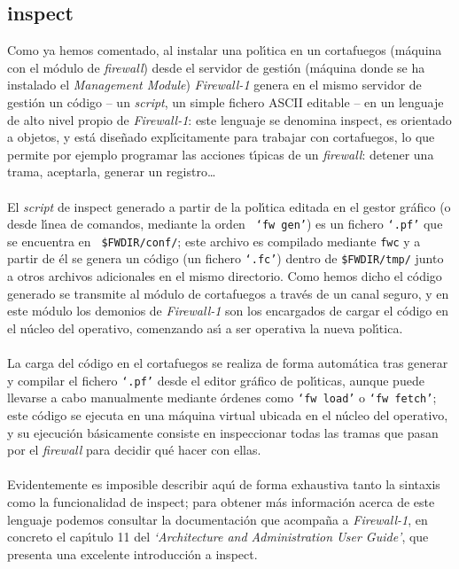 \subsection{\sc inspect}
\label{inspect}
Como ya hemos comentado, al instalar una pol\'{\i}tica en un cortafuegos 
(m\'aquina con el m\'odulo de {\it firewall}) desde el servidor de gesti\'on
(m\'aquina donde se ha instalado el {\it Management Module}) {\it Firewall-1} 
genera en el mismo servidor de gesti\'on un c\'odigo -- un {\it script}, un
simple fichero ASCII editable -- en un lenguaje de alto nivel propio de {\it 
Firewall-1}: este lenguaje se denomina {\sc inspect}, es orientado a objetos, y 
est\'a dise\~nado expl\'{\i}citamente 
para trabajar con cortafuegos, lo que permite por ejemplo programar las 
acciones t\'{\i}picas de un {\it firewall}: detener una trama, aceptarla, 
generar un registro\ldots\\ 
\\El {\it script} de {\sc inspect} generado a partir de la pol\'{\i}tica editada
en el gestor gr\'afico (o desde l\'{\i}nea de comandos, mediante la orden {\tt
`fw gen'}) es un fichero {\tt `.pf'} que se encuentra en {\tt
\$FWDIR/conf/}; este archivo es compilado mediante {\tt fwc} y a partir de \'el 
se genera un c\'odigo (un fichero {\tt `.fc'}) dentro de {\tt \$FWDIR/tmp/}
junto a otros archivos adicionales en el mismo directorio. Como hemos dicho el
c\'odigo generado se transmite al m\'odulo 
de cortafuegos a trav\'es de un canal seguro, y en este m\'odulo los demonios de
{\it Firewall-1} son los encargados de cargar el c\'odigo en el n\'ucleo del
operativo, comenzando as\'{\i} a ser operativa la nueva pol\'{\i}tica.\\
\\La carga del c\'odigo en el cortafuegos se realiza de forma autom\'atica tras
generar y compilar el fichero {\tt `.pf'} desde el editor gr\'afico de 
pol\'{\i}ticas, aunque puede llevarse a cabo manualmente mediante \'ordenes como
{\tt `fw load'} o {\tt `fw fetch'}; este c\'odigo se ejecuta en una m\'aquina
virtual ubicada en el n\'ucleo del operativo, y su ejecuci\'on b\'asicamente
consiste en inspeccionar todas las tramas que pasan por el {\it firewall} para
decidir qu\'e hacer con ellas.\\
\\Evidentemente es imposible describir aqu\'{\i} de forma exhaustiva tanto la 
sintaxis como la funcionalidad de {\sc inspect}; para obtener m\'as 
informaci\'on acerca de este lenguaje podemos consultar la documentaci\'on que
acompa\~na a {\it Firewall-1}, en concreto el cap\'{\i}tulo 11 del {\it 
`Architecture and Administration User Guide'}, que presenta una excelente 
introducci\'on a {\sc inspect}.
